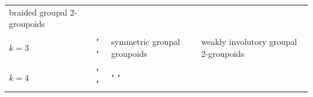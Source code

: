 \documentclass{article}
\begin{document}
\begin{longtable}[]{@{}llll@{}}
\begin{minipage}[t]{0.21\columnwidth}
braided groupal 2-groupoids\strut
\end{minipage}\tabularnewline
\begin{minipage}[t]{0.26\columnwidth}\raggedright
\strut
\end{minipage} & \begin{minipage}[t]{0.21\columnwidth}\raggedright
\strut
\end{minipage} & \begin{minipage}[t]{0.21\columnwidth}\raggedright
\strut
\end{minipage} & \begin{minipage}[t]{0.21\columnwidth}\raggedright
\strut
\end{minipage}\tabularnewline
\begin{minipage}[t]{0.26\columnwidth}\raggedright
\(k=3\)\strut
\end{minipage} & \begin{minipage}[t]{0.21\columnwidth}\raggedright
" "\strut
\end{minipage} & \begin{minipage}[t]{0.21\columnwidth}\raggedright
symmetric groupal groupoids\strut
\end{minipage} & \begin{minipage}[t]{0.21\columnwidth}\raggedright
weakly involutory groupal 2-groupoids\strut
\end{minipage}\tabularnewline
\begin{minipage}[t]{0.26\columnwidth}\raggedright
\strut
\end{minipage} & \begin{minipage}[t]{0.21\columnwidth}\raggedright
\strut
\end{minipage} & \begin{minipage}[t]{0.21\columnwidth}\raggedright
\strut
\end{minipage} & \begin{minipage}[t]{0.21\columnwidth}\raggedright
\strut
\end{minipage}\tabularnewline
\begin{minipage}[t]{0.26\columnwidth}\raggedright
\(k=4\)\strut
\end{minipage} & \begin{minipage}[t]{0.21\columnwidth}\raggedright
" "\strut
\end{minipage} & \begin{minipage}[t]{0.21\columnwidth}\raggedright
" "\strut
\end{minipage} & \begin{minipage}[t]{0.21\columnwidth}\raggedright

\end{minipage}
\end{longtable}
\end{document}
